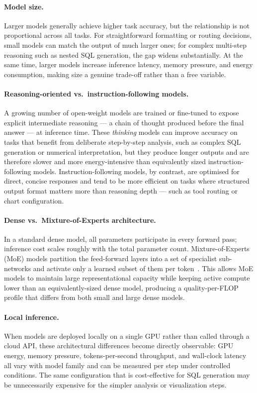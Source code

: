 \paragraph{Model size.}
Larger models generally achieve higher task accuracy, but the relationship is
not proportional across all tasks.
For straightforward formatting or routing decisions, small models can match the
output of much larger ones; for complex multi-step reasoning such as nested SQL
generation, the gap widens substantially.
At the same time, larger models increase inference latency, memory pressure, and
energy consumption, making size a genuine trade-off rather than a free variable.

\paragraph{Reasoning-oriented vs.\ instruction-following models.}
A growing number of open-weight models are trained or fine-tuned to expose
explicit intermediate reasoning --- a chain of thought produced before the final
answer --- at inference time.
These \textit{thinking} models can improve accuracy on tasks that benefit from
deliberate step-by-step analysis, such as complex SQL generation or numerical
interpretation, but they produce longer outputs and are therefore slower and
more energy-intensive than equivalently sized instruction-following models.
Instruction-following models, by contrast, are optimised for direct, concise
responses and tend to be more efficient on tasks where structured output format
matters more than reasoning depth --- such as tool routing or chart configuration.

\paragraph{Dense vs.\ Mixture-of-Experts architecture.}
In a standard dense model, all parameters participate in every forward pass;
inference cost scales roughly with the total parameter count.
Mixture-of-Experts (MoE) models partition the feed-forward layers into a set of
specialist sub-networks and activate only a learned subset of them per
token~\cite{shazeer2017moe}.
This allows MoE models to maintain large representational capacity while keeping
active compute lower than an equivalently-sized dense model, producing a
quality-per-FLOP profile that differs from both small and large dense models.

\paragraph{Local inference.}
When models are deployed locally on a single GPU rather than called through a
cloud API, these architectural differences become directly observable: GPU energy,
memory pressure, tokens-per-second throughput, and wall-clock latency all vary
with model family and can be measured per step under controlled conditions.
The same configuration that is cost-effective for SQL generation may be
unnecessarily expensive for the simpler analysis or visualization steps.

